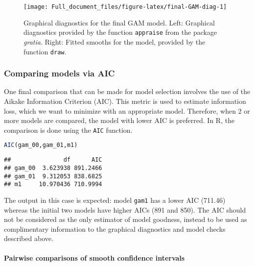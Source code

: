 \documentclass[
]{article}
\newcommand{\passthrough}[1]{#1}
\begin{document}
\begin{figure}[H]

{\centering \texttt{[image: Full\_document\_files/figure-latex/final-GAM-diag-1]} 

}

\caption{Graphical diagnostics for the final GAM model. Left: Graphical diagnostics provided by the function \passthrough{\lstinline!appraise!} from the package \emph{gratia}. Right: Fitted smooths for the model, provided by the function \passthrough{\lstinline!draw!}.}\label{fig:final-GAM-diag}
\end{figure}

\hypertarget{comparing-models-via-aic}{%
\subsubsection{Comparing models via AIC}\label{comparing-models-via-aic}}

One final comparison that can be made for model selection involves the use of the Aikake Information Criterion (AIC). This metric is used to estimate information loss, which we want to minimize with an appropriate model. Therefore, when 2 or more models are compared, the model with lower AIC is preferred. In R, the comparison is done using the \passthrough{\lstinline!AIC!} function.

\begin{lstlisting}[language=R]
AIC(gam_00,gam_01,m1)
\end{lstlisting}

\begin{lstlisting}
##               df      AIC
## gam_00  3.623938 891.2466
## gam_01  9.312053 838.6825
## m1     10.970436 710.9994
\end{lstlisting}

The output in this case is expected: model \passthrough{\lstinline!gam1!} has a lower AIC (711.46) whereas the initial two models have higher AICs (891 and 850). The AIC should not be considered as the only estimator of model goodness, instead to be used as complimentary information to the graphical diagnostics and model checks described above.

\hypertarget{pairwise-comparisons-of-smooth-confidence-intervals}{%
\paragraph{Pairwise comparisons of smooth confidence intervals}\label{pairwise-comparisons-of-smooth-confidence-intervals}}
\end{document}
